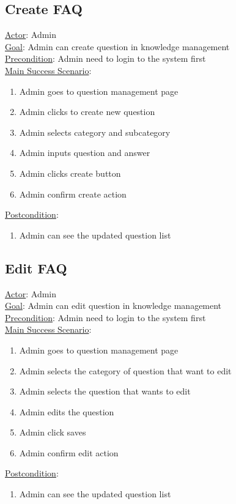 \documentclass[12pt,oneside,openright,a4paper]{cpe-english-project}
\begin{document}
\subsection{Create FAQ}
\underline{Actor}: Admin\\
\underline{Goal}: Admin can create question in knowledge management\\
\underline{Precondition}: Admin need to login to the system first\\
\underline{Main Success Scenario}:
\begin{enumerate}[label={\arabic*.}]
	\item Admin goes to question management page
	\item Admin clicks to create new question
	\item Admin selects category and subcategory
	\item Admin inputs question and answer
	\item Admin clicks create button
	\item Admin confirm create action
\end{enumerate}
\underline{Postcondition}: 
\begin{enumerate}[label={\arabic*.}]
	\item Admin can see the updated question list
\end{enumerate}

\subsection{Edit FAQ}
\underline{Actor}: Admin\\
\underline{Goal}: Admin can edit question in knowledge management\\
\underline{Precondition}: Admin need to login to the system first\\
\underline{Main Success Scenario}:
\begin{enumerate}[label={\arabic*.}]
	\item Admin goes to question management page
	\item Admin selects the category of question that want to edit
	\item Admin selects the question that wants to edit
	\item Admin edits the question
	\item Admin click saves
	\item Admin confirm edit action
\end{enumerate}
\underline{Postcondition}: 
\begin{enumerate}[label={\arabic*.}]
	\item Admin can see the updated question list
\end{enumerate}
\end{document}
